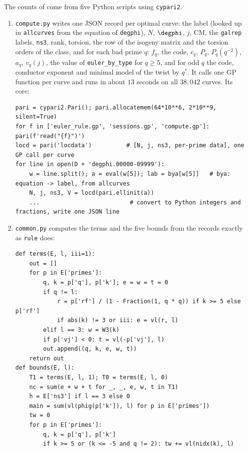 \begin{sloppypar}
\begin{remark}\label{rem:computation:book-scripts}
The counts of  come from five Python scripts using \texttt{cypari2}.
\begin{enumerate}[label=(\roman*)]
\item \texttt{compute.py} writes one JSON record per optimal curve: the label (looked up in \texttt{allcurves} from the equation of \texttt{degphi}), $N$,
$\degphi$, $j$, CM, the \texttt{galrep} labels, \texttt{ns3}, rank, torsion, the row of the isogeny matrix and the torsion orders of the class, and for each bad
prime $q$: $f_q$, the code, $c_q$, $P_q$, $P_q(q^{-2})$, $a_q$, $v_q(j)$, the value of \texttt{euler\_by\_type} for $q\ge5$, and for odd $q$ the code, conductor exponent and
minimal model of the twist by $q^*$. It calls one GP function per curve and runs in about $13$ seconds on all $38{,}042$ curves. Its core:
\begin{lstlisting}[basicstyle=\ttfamily\scriptsize]
pari = cypari2.Pari(); pari.allocatemem(64*10**6, 2*10**9, silent=True)
for f in ['euler_rule.gp', 'sessions.gp', 'compute.gp']: pari(f'read("{f}")')
locd = pari('locdata')          # [N, j, ns3, per-prime data], one GP call per curve
for line in open(D + 'degphi.00000-09999'):
    w = line.split(); a = eval(w[5]); lab = bya[w[5]]   # bya: equation -> label, from allcurves
    N, j, ns3, V = locd(pari.ellinit(a))
    ...                          # convert to Python integers and fractions, write one JSON line
\end{lstlisting}
\item \texttt{common.py} computes the terms and the five bounds from the records exactly as \texttt{rule} does:
\begin{lstlisting}[basicstyle=\ttfamily\scriptsize]
def terms(E, l, iii=1):
    out = []
    for p in E['primes']:
        q, k = p['q'], p['k']; e = w = t = 0
        if q != l:
            r = p['rf'] / (1 - Fraction(1, q * q)) if k >= 5 else p['rf']
            if abs(k) != 3 or iii: e = vl(r, l)
        elif l == 3: w = W3(k)
        if p['vj'] < 0: t = vl(-p['vj'], l)
        out.append((q, k, e, w, t))
    return out
def bounds(E, l):
    T1 = terms(E, l, 1); T0 = terms(E, l, 0)
    nc = sum(e + w + t for _, _, e, w, t in T1)
    h = E['ns3'] if l == 3 else 0
    main = sum(vl(phig(p['k']), l) for p in E['primes'])
    tw = 0
    for p in E['primes']:
        q, k = p['q'], p['k']
        if k >= 5 or (k <= -5 and q != 2): tw += vl(nidx(k), l)

\end{lstlisting}
\end{enumerate}
\end{remark}
\end{sloppypar}
